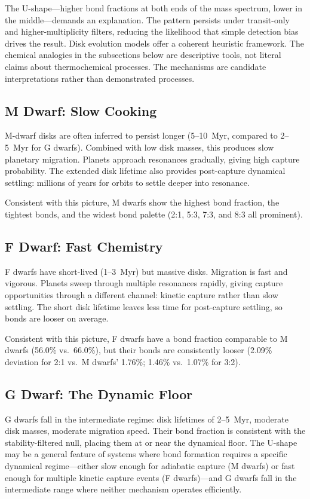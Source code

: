 \documentclass[twocolumn,usenatbib]{mnras}
\begin{document}
The U-shape---higher bond fractions at both ends of the mass spectrum, lower
in the middle---demands an explanation. The pattern persists under
transit-only and higher-multiplicity filters, reducing the likelihood that
simple detection bias drives the result. Disk evolution models offer a coherent
heuristic framework. The chemical analogies in the subsections below are
descriptive tools, not literal claims about thermochemical processes. The
mechanisms are candidate interpretations rather than demonstrated processes.

\subsection{M Dwarf: Slow Cooking}

M-dwarf disks are often inferred to persist longer (5--10~Myr, compared to
2--5~Myr for G dwarfs)\citep{yasui2010,haisch2001}. Combined with low disk
masses, this produces slow planetary migration. Planets approach resonances
gradually, giving high capture probability. The extended disk lifetime also
provides post-capture dynamical settling: millions of years for orbits to
settle deeper into resonance.

Consistent with this picture, M dwarfs show the highest bond fraction, the
tightest bonds, and the widest bond palette (2:1, 5:3, 7:3, and 8:3 all
prominent).

\subsection{F Dwarf: Fast Chemistry}

F dwarfs have short-lived (1--3~Myr) but massive
disks\citep{sicilia_aguilar}. Migration is fast and vigorous. Planets sweep
through multiple resonances rapidly, giving capture opportunities through a
different channel: kinetic capture rather than slow settling. The short disk
lifetime leaves less time for post-capture settling, so bonds are looser on
average.

Consistent with this picture, F dwarfs have a bond fraction comparable to M
dwarfs (56.0\% vs.\ 66.0\%), but their bonds are consistently looser (2.09\%
deviation for 2:1 vs.\ M dwarfs' 1.76\%; 1.46\% vs.\ 1.07\% for 3:2).

\subsection{G Dwarf: The Dynamic Floor}

G dwarfs fall in the intermediate regime: disk lifetimes of 2--5~Myr, moderate
disk masses, moderate migration speed. Their bond fraction is consistent with
the stability-filtered null, placing them at or near the dynamical floor. The
U-shape may be a general feature of systems where bond formation requires a
specific dynamical regime---either slow enough for adiabatic capture (M dwarfs)
or fast enough for multiple kinetic capture events (F dwarfs)---and G dwarfs
fall in the intermediate range where neither mechanism operates efficiently.
\end{document}
